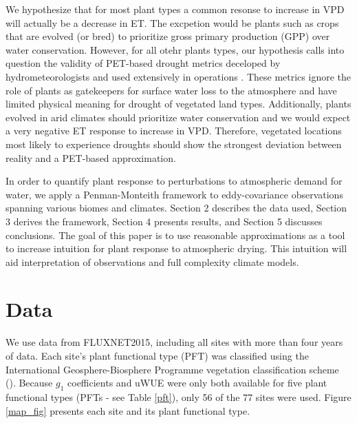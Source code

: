 \documentclass[draft,linenumbers]{agujournal}
\begin{document}
We hypothesize that for most plant types a common resonse to increase in VPD will actually be a decrease in ET. The excpetion would be plants such as crops that are evolved (or bred) to prioritize gross primary production (GPP) over water conservation. However, for all otehr plants types, our hypothesis calls into question the validity of PET-based drought metrics deceloped by hydrometeorologists and used extensively in operations \citep[e.g. PDSI, P-PET,][]{2002, Alley_1984} . These metrics ignore the role of plants as gatekeepers for surface water loss to the atmosphere and have limited physical meaning for drought of vegetated land types. Additionally, plants evolved in arid climates should prioritize water conservation and we would expect a very negative ET response to increase in VPD. Therefore, vegetated locations most likely to experience droughts should show the strongest deviation between reality and a PET-based approximation. 

In order to quantify plant response to perturbations to atmospheric demand for water, we apply a Penman-Monteith framework to eddy-covariance observations spanning various biomes and climates. Section 2 describes the data used, Section 3 derives the framework, Section 4 presents results, and Section 5 discusses conclusions. The goal of this paper is to use reasonable approximations as a tool to increase intuition for plant response to atmospheric drying. This intuition will aid interpretation of observations and full complexity climate models. 

\section{Data}
\label{data}
We use data from FLUXNET2015, including all sites with more than four years of data. Each site's plant functional type (PFT) was classified using the International Geosphere-Biosphere Programme vegetation classification scheme (\cite{Loveland_1999}).  Because $g_1$ coefficients \citep{Lin_2015} and uWUE were only both available for five plant functional types (PFTs - see Table \ref{pft}),  only 56 of the 77 sites were used. Figure \ref{map_fig}  presents each site and its plant functional type.
\end{document}
